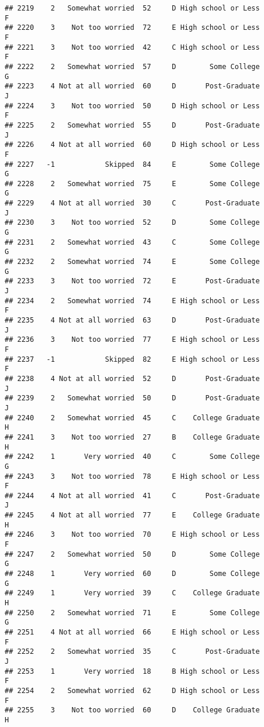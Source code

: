 \documentclass[
]{article}
\begin{document}
\begin{verbatim}
## 2219    2   Somewhat worried  52     D High school or Less         F
## 2220    3    Not too worried  72     E High school or Less         F
## 2221    3    Not too worried  42     C High school or Less         F
## 2222    2   Somewhat worried  57     D        Some College         G
## 2223    4 Not at all worried  60     D       Post-Graduate         J
## 2224    3    Not too worried  50     D High school or Less         F
## 2225    2   Somewhat worried  55     D       Post-Graduate         J
## 2226    4 Not at all worried  60     D High school or Less         F
## 2227   -1            Skipped  84     E        Some College         G
## 2228    2   Somewhat worried  75     E        Some College         G
## 2229    4 Not at all worried  30     C       Post-Graduate         J
## 2230    3    Not too worried  52     D        Some College         G
## 2231    2   Somewhat worried  43     C        Some College         G
## 2232    2   Somewhat worried  74     E        Some College         G
## 2233    3    Not too worried  72     E       Post-Graduate         J
## 2234    2   Somewhat worried  74     E High school or Less         F
## 2235    4 Not at all worried  63     D       Post-Graduate         J
## 2236    3    Not too worried  77     E High school or Less         F
## 2237   -1            Skipped  82     E High school or Less         F
## 2238    4 Not at all worried  52     D       Post-Graduate         J
## 2239    2   Somewhat worried  50     D       Post-Graduate         J
## 2240    2   Somewhat worried  45     C    College Graduate         H
## 2241    3    Not too worried  27     B    College Graduate         H
## 2242    1       Very worried  40     C        Some College         G
## 2243    3    Not too worried  78     E High school or Less         F
## 2244    4 Not at all worried  41     C       Post-Graduate         J
## 2245    4 Not at all worried  77     E    College Graduate         H
## 2246    3    Not too worried  70     E High school or Less         F
## 2247    2   Somewhat worried  50     D        Some College         G
## 2248    1       Very worried  60     D        Some College         G
## 2249    1       Very worried  39     C    College Graduate         H
## 2250    2   Somewhat worried  71     E        Some College         G
## 2251    4 Not at all worried  66     E High school or Less         F
## 2252    2   Somewhat worried  35     C       Post-Graduate         J
## 2253    1       Very worried  18     B High school or Less         F
## 2254    2   Somewhat worried  62     D High school or Less         F
## 2255    3    Not too worried  60     D    College Graduate         H

\end{verbatim}
\end{document}
